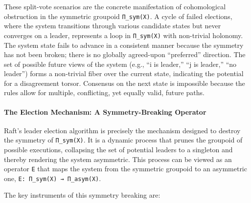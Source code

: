 \documentclass[
]{article}
\begin{document}
These split-vote scenarios are the concrete manifestation of
cohomological obstruction in the symmetric groupoid \texttt{Π\_sym(X)}.
A cycle of failed elections, where the system transitions through
various candidate states but never converges on a leader, represents a
loop in \texttt{Π\_sym(X)} with non-trivial holonomy. The system state
fails to advance in a consistent manner because the symmetry has not
been broken; there is no globally agreed-upon ``preferred'' direction.
The set of possible future views of the system (e.g., ``i is leader,''
``j is leader,'' ``no leader'') forms a non-trivial fiber over the
current state, indicating the potential for a disagreement torsor.
Consensus on the next state is impossible because the rules allow for
multiple, conflicting, yet equally valid, future paths.

\paragraph{The Election Mechanism: A Symmetry-Breaking
Operator}\label{the-election-mechanism-a-symmetry-breaking-operator}

Raft's leader election algorithm is precisely the mechanism designed to
destroy the symmetry of \texttt{Π\_sym(X)}. It is a dynamic process that
prunes the groupoid of possible executions, collapsing the set of
potential leaders to a singleton and thereby rendering the system
asymmetric. This process can be viewed as an operator \texttt{E} that
maps the system from the symmetric groupoid to an asymmetric one,
\texttt{E:\ Π\_sym(X)\ →\ Π\_asym(X)}.

The key instruments of this symmetry breaking are:
\end{document}
